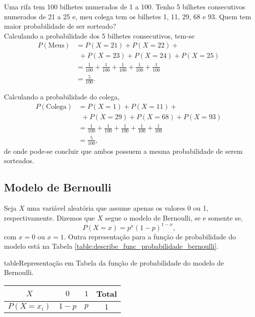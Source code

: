 \documentclass[11pt,fleqn]{book}
\numberwithin{mpicture}{chapter}
\numberwithin{mtable}{chapter}
\numberwithin{mframe}{chapter}
\begin{document}



\begin{example}
	Uma rifa tem 100 bilhetes numerados de 1 a 100. Tenho 5 bilhetes consecutivos numerados de 21 a 25 e, meu colega tem os bilhetes 1, 11, 29, 68 e 93. Quem tem maior probabilidade de ser sorteado?\\
	
	Calculando a probabilidade dos 5 bilhetes consecutivos, tem-se
	\begin{align*}
		P(\text{Meus})&=P(X=21)+P(X=22)+\\
					  &\hspace{5pt}+P(X=23)+P(X=24)+P(X=25)\\
					  &=\frac{1}{100}+\frac{1}{100}+\frac{1}{100}+\frac{1}{100}+\frac{1}{100}\\
					  &=\frac{5}{100}\text{.}
	\end{align*}
	
	Calculando a probabilidade do colega,
	\begin{align*}
		P(\text{Colega})&=P(X=1)+P(X=11)+\\
						&\hspace{5pt}+P(X=29)+P(X=68)+P(X=93)\\
						&=\frac{1}{100}+\frac{1}{100}+\frac{1}{100}+\frac{1}{100}+\frac{1}{100}\\
					  &=\frac{5}{100}\text{,}
	\end{align*}
	de onde pode-se concluir que ambos possuem a mesma probabilidade de serem sorteados.
\end{example}

\subsection{Modelo de Bernoulli}

Seja $X$ uma variável aleatória que assume apenas os valores 0 ou 1, respectivamente. Dizemos que $X$ segue o modelo de Bernoulli, se e somente se,
\begin{equation}
	P(X=x)=p^x(1-p)^{1-x}\text{,}
\end{equation}
com $x=0$ ou $x=1$. Outra representação para a função de probabilidade do modelo está na Tabela \ref{table:describe_func_probabilidade_bernoulli}.

\begin{sidepicture}{5cm}{table}{Representação em Tabela da função de probabilidade do modelo de Bernoulli.}
	\label{table:describe_func_probabilidade_bernoulli}
	\begin{tabular}{c|cc|c}\toprule
		$X$ & $0$ & $1$ & Total \\ \midrule
		$P(X=x_i)$ & $1-p$ & $p$ & $1$\\\bottomrule
	\end{tabular}
\end{sidepicture}
\end{document}
